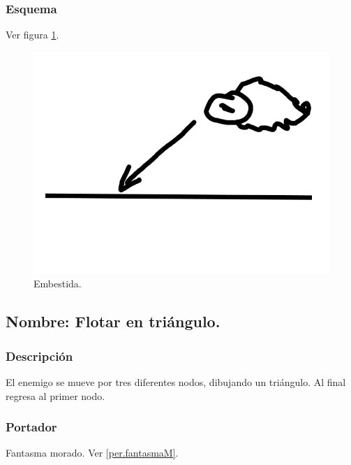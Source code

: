 \documentclass[11pt,letterpaper]{article}
\begin{document}
		\subsubsection{Esquema}
		Ver figura \ref{fig:embestida}.
		\begin{figure}
			\centering
			\includegraphics[height=0.2 \textheight]{Imagenes/embestida}
			\caption{Embestida.}
			\label{fig:embestida}
		\end{figure}
	\subsection{Nombre: Flotar en triángulo.} \label{hab.flotarT}
		\subsubsection{Descripción}
		El enemigo se mueve por tres diferentes nodos, dibujando un triángulo. Al final regresa al primer nodo.
		\subsubsection{Portador}
		Fantasma morado. Ver \ref{per.fantasmaM}.
\end{document}
